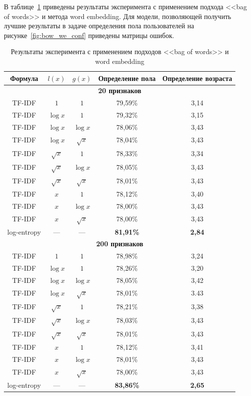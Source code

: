 В таблице~\ref{tab:bow_we} приведены результаты эксперимента
с применением подхода <<bag of words>> и метода word embedding.
Для модели, позволяющей получить лучшие результаты в задаче
определения пола пользователей на рисунке~\ref{fig:bow_we_conf}
приведены матрицы ошибок.

\begin{table}[!h]
    \caption{Результаты эксперимента с применением подходов
            <<bag of words>> и word embedding}
    \label{tab:bow_we}
\centering
\begin{tabular}{|c|c|c|c|c|}\hline
    \textbf{Формула} & \boldmath$l(x)$ & \boldmath$g(x)$ & \textbf{Определение пола} & \textbf{Определение возраста} \\\hline
    \multicolumn{5}{|c|}{\textbf{20 признаков}} \\\hline
    TF-IDF & $1$ & $1$ & 79,59\% & 3,14 \\\hline
    TF-IDF & $\log{x}$ & $1$ & 79,32\% & 3,15 \\\hline
    TF-IDF & $\log{x}$ & $\log{x}$ & 78,06\% & 3,43 \\\hline
    TF-IDF & $\log{x}$ & $\sqrt{x}$ & 78,04\% & 3,43 \\\hline
    TF-IDF & $\sqrt{x}$ & $1$ & 78,33\% & 3,34 \\\hline
    TF-IDF & $\sqrt{x}$ & $\log{x}$ & 78,05\% & 3,43 \\\hline
    TF-IDF & $\sqrt{x}$ & $\sqrt{x}$ & 78,01\% & 3,43 \\\hline
    TF-IDF & $x$ & $1$ & 78,12\% & 3,40 \\\hline
    TF-IDF & $x$ & $\log{x}$ & 78,00\% & 3,43 \\\hline
    TF-IDF & $x$ & $\sqrt{x}$ & 78,00\% & 3,43 \\\hline
    log-entropy & --- & --- & \textbf{81,91\%} & \textbf{2,84} \\\hline
    \multicolumn{5}{|c|}{\textbf{200 признаков}} \\\hline
    TF-IDF & $1$ & $1$ & 78,98\% & 3,24 \\\hline
    TF-IDF & $\log{x}$ & $1$ & 78,26\% & 3,20 \\\hline
    TF-IDF & $\log{x}$ & $\log{x}$ & 78,05\% & 3,42 \\\hline
    TF-IDF & $\log{x}$ & $\sqrt{x}$ & 78,01\% & 3.43 \\\hline
    TF-IDF & $\sqrt{x}$ & $1$ & 78,21\% & 3,38 \\\hline
    TF-IDF & $\sqrt{x}$ & $\log{x}$ & 78,03\% & 3,43 \\\hline
    TF-IDF & $\sqrt{x}$ & $\sqrt{x}$ & 78,01\% & 3,43 \\\hline
    TF-IDF & $x$ & $1$ & 78,12\% & 3,41 \\\hline
    TF-IDF & $x$ & $\log{x}$ & 78,01\% & 3,43 \\\hline
    TF-IDF & $x$ & $\sqrt{x}$ & 78,00\% & 3,43 \\\hline
    log-entropy & --- & --- & \textbf{83,86\%} & \textbf{2,65} \\\hline
\end{tabular}
\end{table}


